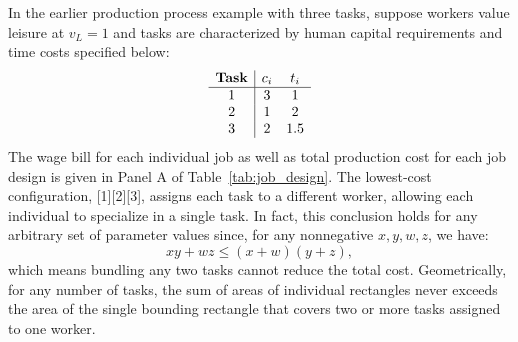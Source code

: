 \documentclass{article}
\theoremstyle{plain}
\theoremstyle{plain}
\begin{document}
In the earlier  production process example with three tasks, suppose workers value leisure at $v_L = 1$ and tasks are characterized by human capital requirements and time costs specified below:
\[
\begin{array}{c|ccc}
\textbf{Task} & c_{i} & t_{i} \\ \hline
1 & 3  & 1 \\
2 & 1 & 2  \\
3 & 2   & 1.5 \\
\end{array}
\]
The wage bill for each individual job as well as total production cost for each job design is given in Panel A of Table~\ref{tab:job_design}.
The lowest‐cost configuration, [1][2][3], assigns each task to a different worker, allowing each individual to specialize in a single task.  
In fact, this conclusion holds for any arbitrary set of parameter values since, for any nonnegative $x,y,w,z$, we have:
\[
  xy + wz \le (x + w)(y + z),
\]
which means bundling any two tasks cannot reduce the total cost.  
Geometrically, for any number of tasks, the sum of areas of individual rectangles never exceeds the area of the single bounding rectangle that covers two or more tasks assigned to one worker.
\end{document}
